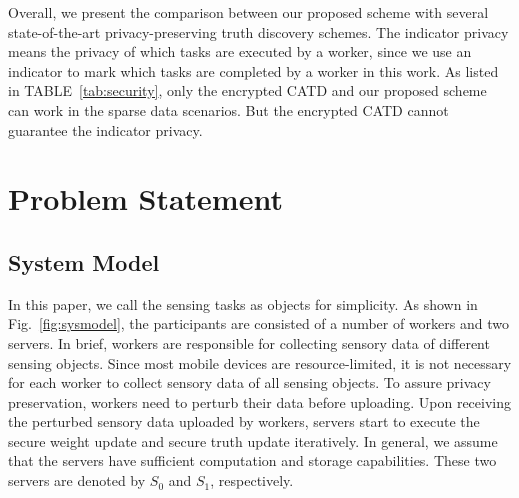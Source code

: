 \documentclass[conference]{IEEEtran}
\begin{document}
Overall, we present the comparison between our proposed scheme with several state-of-the-art privacy-preserving truth discovery schemes.
The indicator privacy means the privacy of which tasks are executed by a worker, since we use an indicator to mark which tasks are completed by a worker in this work.
As listed in TABLE~\ref{tab:security}, only the encrypted CATD and our proposed scheme can work in the sparse data scenarios.
But the encrypted CATD cannot guarantee the indicator privacy.



\section{Problem Statement}\label{sec3}

\subsection{System Model}\label{sec3-A}
In this paper, we call the sensing tasks as objects for simplicity.
As shown in Fig.~\ref{fig:sysmodel}, the participants are consisted of a number of workers and two servers.
% 
In brief, workers are responsible for collecting sensory data of different sensing objects.
Since most mobile devices are resource-limited, it is not necessary for each worker to collect sensory data of all sensing objects.
To assure privacy preservation, workers need to perturb their data before uploading.
Upon receiving the perturbed sensory data uploaded by workers, servers start to execute the secure weight update and secure truth update iteratively.
In general, we assume that the servers have sufficient computation and storage capabilities.
These two servers are denoted by $S_0$ and $S_1$, respectively.
\end{document}
